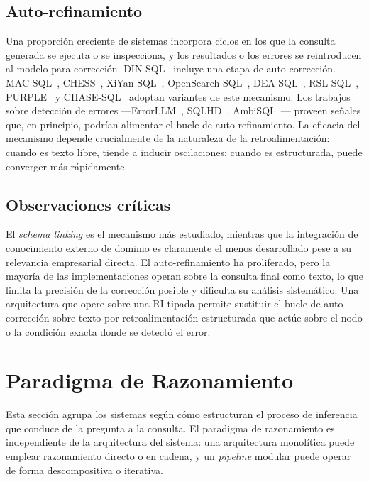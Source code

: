 \subsection{Auto-refinamiento}
\label{subsec:sota-d4-refinement}

Una proporción creciente de sistemas incorpora ciclos en los que la
consulta generada se ejecuta o se inspecciona, y los resultados o los
errores se reintroducen al modelo para corrección.
DIN-SQL~\cite{DIN-SQL2023} incluye una etapa de auto-corrección.
MAC-SQL~\cite{MAC-SQL2023}, CHESS~\cite{CHESS2024},
XiYan-SQL~\cite{XiYan-SQL2024}, OpenSearch-SQL~\cite{OpenSearch-SQL2025},
DEA-SQL~\cite{DEA-SQL2024}, RSL-SQL~\cite{RSL-SQL2024},
PURPLE~\cite{PURPLE2024} y CHASE-SQL~\cite{CHASE-SQL2025} adoptan
variantes de este mecanismo. Los trabajos sobre detección de errores
---ErrorLLM~\cite{errorllm2026}, SQLHD~\cite{SQLHD2025},
AmbiSQL~\cite{AmbiSQL}--- proveen señales que, en principio, podrían
alimentar el bucle de auto-refinamiento. La eficacia del mecanismo
depende crucialmente de la naturaleza de la retroalimentación: cuando
es texto libre, tiende a inducir oscilaciones; cuando es estructurada,
puede converger más rápidamente.

\subsection{Observaciones críticas}
\label{subsec:sota-d4-obs}

El \emph{schema linking} es el mecanismo más estudiado, mientras que la
integración de conocimiento externo de dominio es claramente el menos
desarrollado pese a su relevancia empresarial directa. El
auto-refinamiento ha proliferado, pero la mayoría de las
implementaciones operan sobre la consulta final como texto, lo que
limita la precisión de la corrección posible y dificulta su análisis
sistemático. Una arquitectura que opere sobre una RI tipada permite
sustituir el bucle de auto-corrección sobre texto por
retroalimentación estructurada que actúe sobre el nodo o la condición
exacta donde se detectó el error.

\section{Paradigma de Razonamiento}
\label{sec:sota-d5-razonamiento}

Esta sección agrupa los sistemas según cómo estructuran el proceso de
inferencia que conduce de la pregunta a la consulta. El paradigma de
razonamiento es independiente de la arquitectura del sistema: una
arquitectura monolítica puede emplear razonamiento directo o en cadena,
y un \emph{pipeline} modular puede operar de forma descompositiva o
iterativa.

